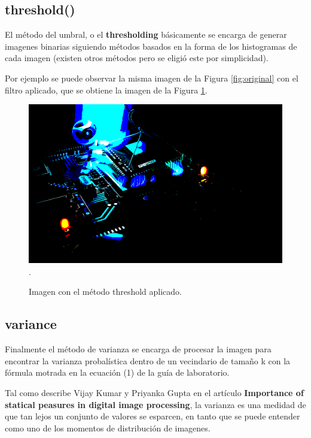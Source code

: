 \documentclass{article}
\begin{document}
\subsection{threshold()}
El m\' etodo del umbral, o el \textbf{thresholding} b\' asicamente se encarga de generar imagenes binarias siguiendo m\' etodos basados en la forma de los histogramas de cada imagen (existen otros m\'
 etodos pero se eligi\' o este por simplicidad).
 
 Por ejemplo se puede observar la misma imagen de la Figura \ref{fig:original} con el filtro aplicado, que se obtiene la imagen de la Figura \ref{fig:umbral}.
 
 \begin{figure}[hbtp]
 \caption{Imagen con el m\' etodo threshold aplicado.}
 \centering
 \includegraphics[scale=0.5]{imagenes/imagen_otsu_threshold.png}
 \label{fig:umbral}.
 \end{figure}
 

\subsection{variance}
Finalmente el m\' etodo de varianza se encarga de procesar la imagen para encontrar la varianza probal\' istica dentro de un vecindario de tama\~ no k con la f\' ormula motrada en la ecuaci\' on (1) de la gu\' ia de laboratorio.

Tal como describe Vijay Kumar y Priyanka Gupta en el art\' iculo \textbf{Importance of statical peasures in digital image processing}, la varianza es una medidad de que tan lejos un conjunto de valores se esparcen, en tanto que se puede entender como uno de los momentos de distribuci\' on de imagenes.
\end{document}
